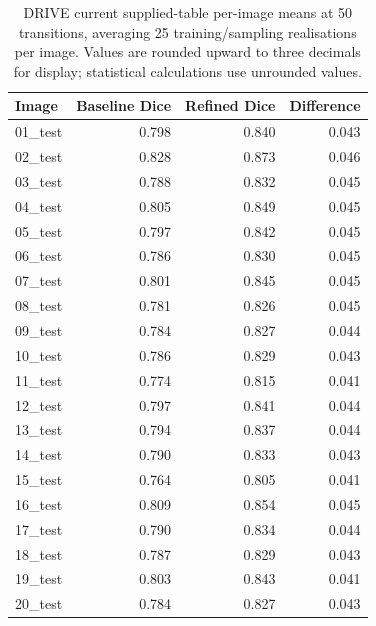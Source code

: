 \documentclass[jimaging,article,submit,pdftex,moreauthors]{Definitions/mdpi}%
\begin{document}
\begin{table}[htbp]
\centering
\caption{DRIVE current supplied-table per-image means at 50 transitions, averaging 25 training/sampling realisations per image. Values are rounded upward to three decimals for display; statistical calculations use unrounded values.}
\label{tab:drive_per_image_supplied}
\scriptsize
\begin{tabular}{lrrr}
\toprule
Image & Baseline Dice & Refined Dice & Difference \\
\midrule
01\_test & 0.798 & 0.840 & 0.043 \\
02\_test & 0.828 & 0.873 & 0.046 \\
03\_test & 0.788 & 0.832 & 0.045 \\
04\_test & 0.805 & 0.849 & 0.045 \\
05\_test & 0.797 & 0.842 & 0.045 \\
06\_test & 0.786 & 0.830 & 0.045 \\
07\_test & 0.801 & 0.845 & 0.045 \\
08\_test & 0.781 & 0.826 & 0.045 \\
09\_test & 0.784 & 0.827 & 0.044 \\
10\_test & 0.786 & 0.829 & 0.043 \\
11\_test & 0.774 & 0.815 & 0.041 \\
12\_test & 0.797 & 0.841 & 0.044 \\
13\_test & 0.794 & 0.837 & 0.044 \\
14\_test & 0.790 & 0.833 & 0.043 \\
15\_test & 0.764 & 0.805 & 0.041 \\
16\_test & 0.809 & 0.854 & 0.045 \\
17\_test & 0.790 & 0.834 & 0.044 \\
18\_test & 0.787 & 0.829 & 0.043 \\
19\_test & 0.803 & 0.843 & 0.041 \\
20\_test & 0.784 & 0.827 & 0.043 \\
\bottomrule
\end{tabular}
\end{table}
\end{document}
